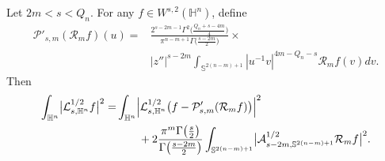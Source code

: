 \documentclass[10pt,a4paper]{amsart}
\begin{document}
\begin{lemma}\label{lm4.4}
Let \(2m < s < Q_n\). For any \(f \in W^{s,2}(\mathbb{H}^{n})\), define
\begin{align}\nonumber
\mathcal{P}'_{s,m}(\mathcal{R}_{m}f)(u)=&\frac{2^{s-2m-1}\Gamma^{2}\bigl(\frac{Q_n+s-4m}{4}\bigr)}
{\pi^{n-m+1}\Gamma\bigl(\frac{s-2m}{2}\bigr)}\times\\
\label{3.11}
&
|z''|^{s-2m}\int_{\mathbb{S}^{2(n-m)+1}} |u^{-1}v|^{4m-Q_n-s}\mathcal{R}_{m}f(v)dv .
\end{align}
Then
\begin{align}\nonumber
\int_{\mathbb{H}^{n}}\bigl|\mathcal{L}_{s,\mathbb{H}^{n}}^{1/2}f\bigr|^{2}
=& \int_{\mathbb{H}^{n}}\Bigl|\mathcal{L}_{s,\mathbb{H}^{n}}^{1/2}\bigl(f-
\mathcal{P}'_{s,m}(\mathcal{R}_{m}f)\bigr)\Bigr|^{2} \\
\label{3.6}
&\qquad + 2\frac{\pi^{m}\Gamma\bigl(\frac{s}{2}\bigr)}{\Gamma\bigl(\frac{s-2m}{2}\bigr)}
\int_{\mathbb{S}^{2(n-m)+1}}\bigl|\mathcal{A}_{s-2m,\mathbb{S}^{2(n-m)+1}}^{1/2}
\mathcal{R}_{m}f\bigr|^{2}.
\end{align}
\end{lemma}
\end{document}
